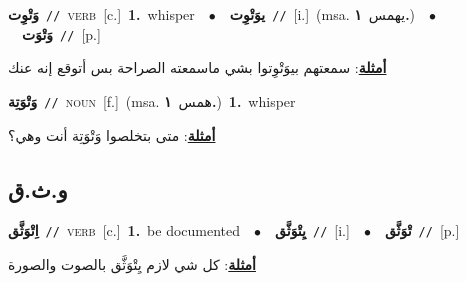 \documentclass[10pt,a4paper,twoside]{article} %
\begin{document}
\begin{multicols}{2}
{{{{{{{\setlength\topsep{0pt}\textbf{\foreignlanguage{arabic}{وَتْوِت}}\ {\color{gray}\texttt{//}\color{black}}\ \textsc{verb}\ [c.]\ \textbf{1.}~whisper\ \ $\bullet$\ \ \setlength\topsep{0pt}\textbf{\foreignlanguage{arabic}{يوَتْوِت}}\ {\color{gray}\texttt{//}\color{black}}\ [i.]\ \color{gray}(msa. \foreignlanguage{arabic}{يهمس}~\foreignlanguage{arabic}{\textbf{١.}})\color{black}\ \ $\bullet$\ \ \setlength\topsep{0pt}\textbf{\foreignlanguage{arabic}{وَتْوَت}}\ {\color{gray}\texttt{//}\color{black}}\ [p.]\  \begin{flushright}\color{gray}\foreignlanguage{arabic}{\textbf{\underline{\foreignlanguage{arabic}{أمثلة}}}: سمعتهم بيوَتْوِتوا بشي ماسمعته الصراحة بس أتوقع إنه عنك}\end{flushright}\color{black}} \vspace{2mm}

{\setlength\topsep{0pt}\textbf{\foreignlanguage{arabic}{وَتْوَتِة}}\ {\color{gray}\texttt{//}\color{black}}\ \textsc{noun}\ [f.]\ \color{gray}(msa. \foreignlanguage{arabic}{همس}~\foreignlanguage{arabic}{\textbf{١.}})\color{black}\ \textbf{1.}~whisper\  \begin{flushright}\color{gray}\foreignlanguage{arabic}{\textbf{\underline{\foreignlanguage{arabic}{أمثلة}}}: متى بتخلصوا وَتْوَتِة أنت وهي؟}\end{flushright}\color{black}} \vspace{2mm}

\vspace{-3mm}
\subsection*{\color{blue}\foreignlanguage{arabic}{و.ث.ق}\color{blue}{}} 

{\setlength\topsep{0pt}\textbf{\foreignlanguage{arabic}{اِتْوَثَّق}}\ {\color{gray}\texttt{//}\color{black}}\ \textsc{verb}\ [c.]\ \textbf{1.}~be documented\ \ $\bullet$\ \ \setlength\topsep{0pt}\textbf{\foreignlanguage{arabic}{يِتْوَثَّق}}\ {\color{gray}\texttt{//}\color{black}}\ [i.]\ \ $\bullet$\ \ \setlength\topsep{0pt}\textbf{\foreignlanguage{arabic}{تْوَثَّق}}\ {\color{gray}\texttt{//}\color{black}}\ [p.]\  \begin{flushright}\color{gray}\foreignlanguage{arabic}{\textbf{\underline{\foreignlanguage{arabic}{أمثلة}}}: كل شي لازم يِتْوَثَّق بالصوت والصورة}\end{flushright}\color{black}} \vspace{2mm}

}}}}}}
\end{multicols}
\end{document}
